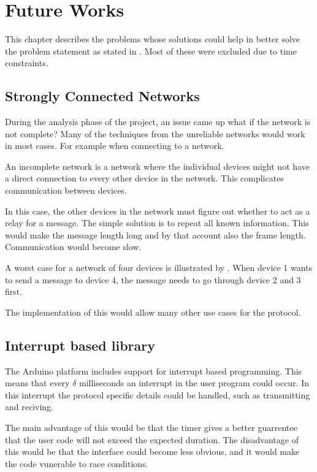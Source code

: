 \chapter{Future Works}
This chapter describes the problems whose solutions could help in better solve the problem statement as stated in . 
Most of these were excluded due to time constraints.

\section{Strongly Connected Networks}
During the analysis phase of the project, an issue came up what if the network is not complete? 
Many of the techniques from the unreliable networks would work in most cases. 
For example when connecting to a network. 

An incomplete network is a network where the individual devices might not have a direct connection to every other device in the network. 
This complicates communication between devices.


In this case, the other devices in the network must figure out whether to act as a relay for a message. 
The simple solution is to repeat all known information. 
This would make the message length long and by that account also the frame length. 
Communication would become slow.

A worst case for a network of four devices is illustrated by .
When device 1 wants to send a message to device 4, the message needs to go through device 2 and 3 first.

The implementation of this would allow many other use cases for the protocol. 

\section{Interrupt based library}

The Arduino platform includes support for interrupt based programming.
This means that every $\delta$ milliseconds an interrupt in the user program could occur.
In this interrupt the protocol specific details could be handled, such as transmitting and reciving.

The main advantage of this would be that the timer gives a better guarrentee that the user code will not exceed the expected duration.
The disadvantage of this would be that the interface could become less obvious, and it would make the code vunerable to race conditions.

